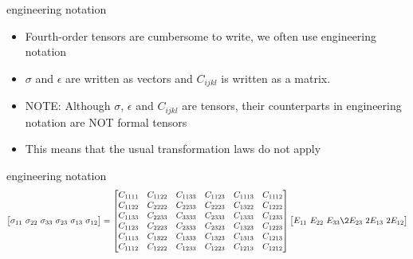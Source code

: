 \documentclass[
  letterpaper,
  ignorenonframetext,
  aspectratio=43,
  handout,
  12pt]{beamer}
\providecommand{\tightlist}{%
  \setlength{\itemsep}{0pt}\setlength{\parskip}{0pt}}
\providecommand{\tightlist}{%
\setlength{\itemsep}{0pt}\setlength{\parskip}{0pt}}
\begin{document}
\begin{frame}{engineering notation}
\protect\hypertarget{engineering-notation}{}
\begin{itemize}
\tightlist
\item
  Fourth-order tensors are cumbersome to write, we often use engineering
  notation
\item
  \(\sigma\) and \(\epsilon\) are written as vectors and \(C_{ijkl}\) is
  written as a matrix.
\item
  NOTE: Although \(\sigma\), \(\epsilon\) and \(C_{ijkl}\) are tensors,
  their counterparts in engineering notation are NOT formal tensors
\item
  This means that the usual transformation laws do not apply
\end{itemize}
\end{frame}

\begin{frame}{engineering notation}
\protect\hypertarget{engineering-notation-1}{}
\[\begin{bmatrix}
  \sigma_{11}\ \sigma_{22} \ \sigma_{33} \ \sigma_{23} \ \sigma_{13} \ \sigma_{12}
  \end{bmatrix}
  = \begin{bmatrix}
  C_{1111} & C_{1122} & C_{1133} & C_{1123} & C_{1113} & C_{1112} \\
  C_{1122} & C_{2222} & C_{2233} & C_{2223} & C_{1322} & C_{1222} \\
  C_{1133} & C_{2233} & C_{3333} & C_{2333} & C_{1333} & C_{1233} \\
  C_{1123} & C_{2223} & C_{2333} & C_{2323} & C_{1323} & C_{1223} \\
  C_{1113} & C_{1322} & C_{1333} & C_{1323} & C_{1313} & C_{1213} \\
  C_{1112} & C_{1222} & C_{1233} & C_{1223} & C_{1213} & C_{1212}
  \end{bmatrix}\begin{bmatrix}
  E_{11} \ E_{22} \ E_{33} \2E_{23} \ 2E_{13} \ 2E_{12}
\end{bmatrix}\]
\end{frame}
\end{document}
